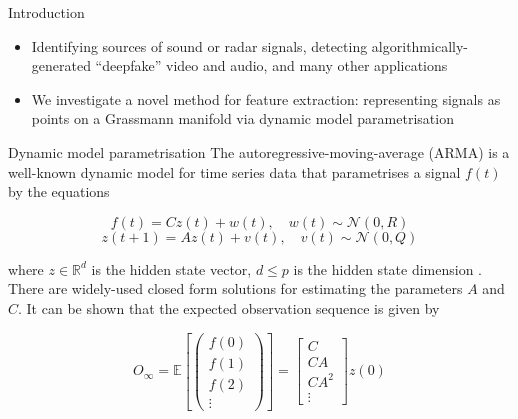 \documentclass[final]{beamer}
\newlength{\onecolwid}
\begin{document}
\begin{frame}[t]
\begin{columns}[t]
\begin{column}{\onecolwid}
\begin{block}{Introduction}
\begin{itemize}
        \item Identifying sources of sound or radar signals, detecting algorithmically-generated
            ``deepfake'' video and audio, and many other applications

        \item We investigate a novel method for feature extraction: representing signals as points
            on a Grassmann manifold via dynamic model parametrisation
    \end{itemize}
\end{block}


\begin{block}{Dynamic model parametrisation}
    The autoregressive-moving-average (ARMA) is a well-known dynamic model for time series data that
    parametrises a signal $f(t)$ by the equations

    \begin{equation}
        f(t) = Cz(t) + w(t), \quad w(t) \sim \mathcal{N}(0, R)
    \end{equation}
    \begin{equation}
        z(t + 1) = Az(t) + v(t), \quad v(t) \sim \mathcal{N}(0, Q)
    \end{equation}

    where $z \in \mathbb{R}^d$ is the hidden state vector, $d \leq p$ is the hidden state dimension
    \cite{turaga_statistical_2011}. There are widely-used closed form solutions for estimating the
    parameters $A$ and $C$. It can be shown that the expected observation sequence is given by

    \begin{equation}\label{eq:observation}
        O_\infty = \mathbb{E}\left[\begin{pmatrix} f(0) \\ f(1) \\ f(2) \\ \vdots
            \end{pmatrix}\right] = \begin{bmatrix} C \\ CA \\ CA^2 \\ \vdots \end{bmatrix} z(0)
    \end{equation}
\end{block}


\end{column}
\end{columns}
\end{frame}
\end{document}
